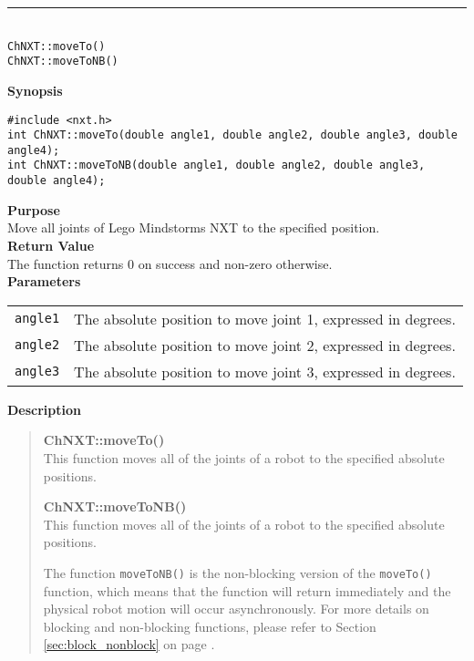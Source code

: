 \noindent
\vspace{5pt}
\rule{4.5in}{0.015in}\\
\noindent
{\LARGE \texttt{ChNXT::moveTo()} }\\
{\LARGE \texttt{ChNXT::moveToNB()} }\\


\noindent
{\bf Synopsis}
\vspace{-8pt}
\begin{verbatim}
#include <nxt.h>
int ChNXT::moveTo(double angle1, double angle2, double angle3, double angle4);
int ChNXT::moveToNB(double angle1, double angle2, double angle3, double angle4);
\end{verbatim}

\noindent
{\bf Purpose}\\
Move all joints of Lego Mindstorms NXT to the specified position.\\

\noindent
{\bf Return Value}\\
The function returns 0 on success and non-zero otherwise.\\

\noindent
{\bf Parameters}\\
\vspace{-0.1in}
\begin{description}
\item               
\begin{tabular}{p{15 mm}p{105 mm}}
\texttt{angle1} & The absolute position to move joint 1, expressed in degrees. \\
\texttt{angle2} & The absolute position to move joint 2, expressed in degrees. \\
\texttt{angle3} & The absolute position to move joint 3, expressed in degrees. \\
\end{tabular}
\end{description}

\noindent
{\bf Description}\\
\vspace{-12pt}
\begin{quote}
{\bf ChNXT::moveTo()}\\
This function moves all of the joints of a robot to the specified 
absolute positions. 

{\bf ChNXT::moveToNB()}\\
This function moves all of the joints of a robot to the specified 
absolute positions. 

The function \texttt{moveToNB()} is the non-blocking version of
the \texttt{moveTo()} function, which means that the function will
return immediately and the physical robot motion will occur 
asynchronously. For more details on blocking and non-blocking 
functions, please refer to Section \ref{sec:block_nonblock} on page 
\pageref{sec:block_nonblock}.\\
\end{quote}

